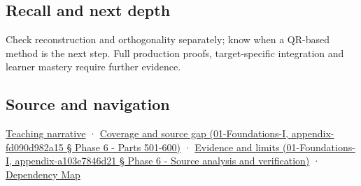 \subsection{Recall and next depth}\label{recall-and-next-depth}

Check reconstruction and orthogonality separately; know when a QR-based method is the next step. Full production proofs, target-specific integration and learner mastery require further evidence.

\subsection{Source and navigation}\label{source-and-navigation}

\href{Continuous\%20Notes/Computing\%20Foundations\%20-\%20From\%20Bits\%20to\%20C++\%20and\%20Systems\%20APIs\#Orthonormal\%20frames\%20make\%20reconstruction\%20simple}{Teaching narrative} · \href{}{Coverage and source gap (01-Foundations-I, appendix-fd090d982a15 § Phase 6 - Parts 501-600)} · \href{}{Evidence and limits (01-Foundations-I, appendix-a103e7846d21 § Phase 6 - Source analysis and verification)} · \hyperref[appendix-4ad47bdd269a]{Dependency Map}
